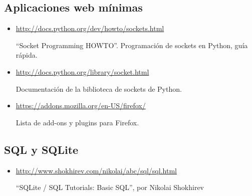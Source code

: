 \subsection{Aplicaciones web mínimas}

\begin{itemize}
\item \url{http://docs.python.org/dev/howto/sockets.html}

``Socket Programming HOWTO''. Programación de sockets en Python, guía rápida.

\item \url{http://docs.python.org/library/socket.html}

Documentación de la biblioteca de sockets de Python.

\item \url{https://addons.mozilla.org/en-US/firefox/} 

Lista de add-ons y plugins para Firefox.

\end{itemize}

\subsection{SQL y SQLite}


\begin{itemize}
\item \url{http://www.shokhirev.com/nikolai/abc/sql/sql.html}

``SQLite / SQL Tutorials: Basic SQL'', por Nikolai Shokhirev

\end{itemize}
